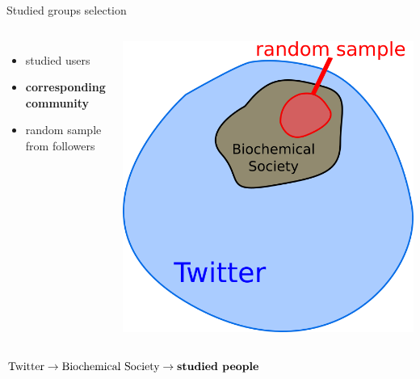 \documentclass[notheorems,12pt]{beamer}
\begin{document}
\begin{frame}{Studied groups selection}
    \vspace{-0.7cm}
    \begin{columns}
    \column{5cm}
    	\begin{itemize}
    		\item studied users
    		\item \textbf{corresponding community}
    		\item random sample from followers
    	\end{itemize}
    \column{6cm}
    	\center
        \vspace{0.5cm}
    	\includegraphics[scale=0.32]{./Pics/sets.png}
    \end{columns}
    \center
    \begin{large}
        $\text{Twitter} \rightarrow \text{Biochemical Society} \rightarrow \text{\textbf{studied people}}$
    \end{large}
\end{frame}
\end{document}
